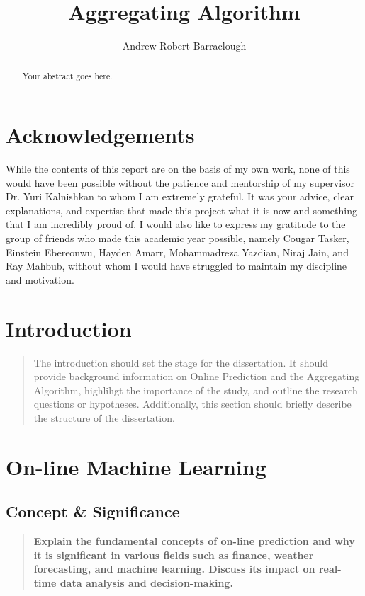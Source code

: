 \documentclass[11pt]{article} %
\title{Aggregating Algorithm}
\author{Andrew Robert Barraclough}
\theoremstyle{plain}
\theoremstyle{definition}
\begin{document}
\maketitle

\declaration

\begin{abstract}
  Your abstract goes here.
\end{abstract}

\section*{Acknowledgements}
While the contents of this report are on the basis of my own work, none of this would have been possible without the patience and mentorship of my supervisor Dr. Yuri Kalnishkan to whom I am extremely grateful. It was your advice, clear explanations, and expertise that made this project what it is now and something that I am incredibly proud of.
I would also like to express my gratitude to the group of friends who made this academic year possible, namely Cougar Tasker, Einstein Ebereonwu, Hayden Amarr, Mohammadreza Yazdian, Niraj Jain, and Ray Mahbub, without whom I would have struggled to maintain my discipline and motivation.
\newpage

\section{Introduction}
\begin{quote}
  The introduction should set the stage for the dissertation. It should provide background information on Online Prediction and the Aggregating Algorithm, highlihgt the importance of the study, and outline the research questions or hypotheses. Additionally, this section should briefly describe the structure of the dissertation.
\end{quote}

\newpage

\section{On-line Machine Learning}
\subsection{Concept \& Significance}
\begin{quote}
  \textbf{Explain the fundamental concepts of on-line prediction and why it is significant in various fields such as finance, weather forecasting, and machine learning. Discuss its impact on real-time data analysis and decision-making.}
\end{quote}
\end{document}

